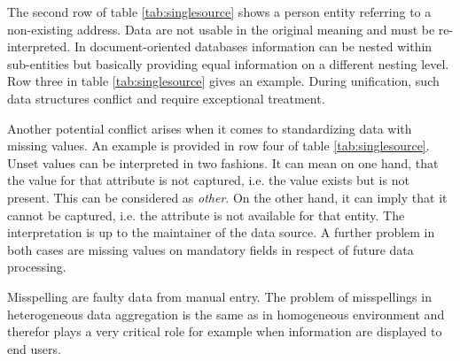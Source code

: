 The second row of table \ref{tab:singlesource} shows a person entity referring to a non-existing address. Data are not usable in the original meaning and must be re-interpreted. In document-oriented databases information can be nested within sub-entities but basically providing equal information on a different nesting level. Row three in table \ref{tab:singlesource} gives an example. During unification, such data structures conflict and require exceptional treatment. 

Another potential conflict arises when it comes to standardizing data with missing values. An example is provided in row four of table \ref{tab:singlesource}. Unset values can be interpreted in two fashions. It can mean on one hand, that the value for that attribute is not captured, i.e. the value exists but is not present. This can be considered as \textit{other}. On the other hand, it can imply that it cannot be captured, i.e. the attribute is not available for that entity. The interpretation is up to the maintainer of the data source.  A further problem in both cases are missing values on mandatory fields in respect of future data processing.

Misspelling are faulty data from manual entry. The problem of misspellings in heterogeneous data aggregation is the same as in homogeneous environment and therefor plays a very critical role for example when information are displayed to end users.  

\begin{table}[htb]
\centering
{}
\caption{Examples of single source problems}
\label{tab:singlesource}
\end{table}

